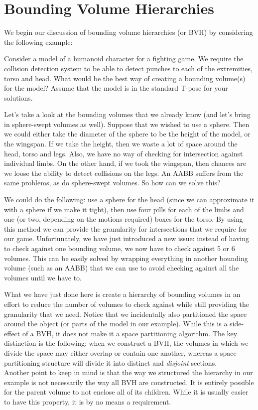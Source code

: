 \chapter{Bounding Volume Hierarchies}
  We begin our discussion of bounding volume hierarchies (or BVH) by considering
  the following example:
  \begin{exmp}
    Consider a model of a humanoid character for a fighting game. We require the
    collision detection system to be able to detect punches to each of the
    extremities, torso and head. What would be the best way of creating a
    bounding volume(s) for the model? Assume that the model is in the standard
    T-pose for your solutions.
  \end{exmp}

  Let's take a look at the bounding volumes that we already know (and let's
  bring in sphere-swept volumes as well). Suppose that we wished to use a
  sphere. Then we could either take the diameter of the sphere to be the height
  of the model, or the wingspan. If we take the height, then we waste a lot of
  space around the head, torso and legs. Also, we have no way of checking for
  intersection against individual limbs. On the other hand, if we took the
  wingspan, then chances are we loose the ability to detect collisions on the
  legs. An AABB suffers from the same problems, as do sphere-swept volumes. So
  how can we solve this?

  We could do the following: use a sphere for the head (since we can approximate
  it with a sphere if we make it tight), then use four pills for each of the
  limbs and one (or two, depending on the motions required) boxes for the torso.
  By using this method we can provide the granularity for intersections that we
  require for our game. Unfortunately, we have just introduced a new issue:
  instead of having to check against one bounding volume, we now have to check
  against 5 or 6 volumes. This can be easily solved by wrapping everything in
  another bounding volume (such as an AABB) that we can use to avoid checking
  against all the volumes until we have to.

  What we have just done here is create a hierarchy of bounding volumes in an
  effort to reduce the number of volumes to check against while still providing
  the granularity that we need. Notice that we incidentally also partitioned the
  space around the object (or parts of the model in our example). While this is
  a side-effect of a BVH, it does not make it a space partitioning algorithm.
  The key distinction is the following: when we construct a BVH, the volumes in
  which we divide the space may either overlap or contain one another, whereas a
  space partitioning structure will divide it into distinct and \emph{disjoint}
  sections. \\
  Another point to keep in mind is that the way we structured the hierarchy in
  our example is not necessarily the way all BVH are constructed. It is entirely
  possible for the parent volume to not enclose all of its children. While it is
  usually easier to have this property, it is by no means a requirement.

